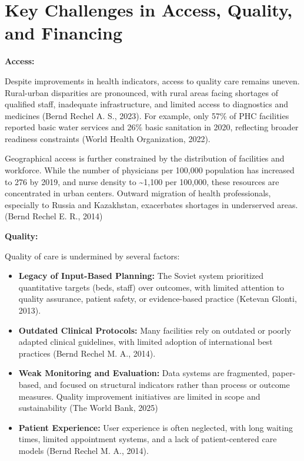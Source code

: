 \section{Key Challenges in Access, Quality, and Financing}\label{key-challenges-in-access-quality-and-financing}

\textbf{Access:}

Despite improvements in health indicators, access to quality care
remains uneven. Rural-urban disparities are pronounced, with rural areas
facing shortages of qualified staff, inadequate infrastructure, and
limited access to diagnostics and medicines (Bernd Rechel A. S., 2023).
For example, only 57\% of PHC facilities reported basic water services
and 26\% basic sanitation in 2020, reflecting broader readiness
constraints (World Health Organization, 2022).

Geographical access is further constrained by the distribution of
facilities and workforce. While the number of physicians per 100,000
population has increased to 276 by 2019, and nurse density to
\textasciitilde1,100 per 100,000, these resources are concentrated in
urban centers. Outward migration of health professionals, especially to
Russia and Kazakhstan, exacerbates shortages in underserved areas.
(Bernd Rechel E. R., 2014)

\textbf{Quality:}

Quality of care is undermined by several factors:

\begin{itemize}
\item
  \textbf{Legacy of Input-Based Planning:} The Soviet system prioritized
  quantitative targets (beds, staff) over outcomes, with limited
  attention to quality assurance, patient safety, or evidence-based
  practice (Ketevan Glonti, 2013).
\item
  \textbf{Outdated Clinical Protocols:} Many facilities rely on outdated
  or poorly adapted clinical guidelines, with limited adoption of
  international best practices (Bernd Rechel M. A., 2014).
\item
  \textbf{Weak Monitoring and Evaluation:} Data systems are fragmented,
  paper-based, and focused on structural indicators rather than process
  or outcome measures. Quality improvement initiatives are limited in
  scope and sustainability (The World Bank, 2025)
\item
  \textbf{Patient Experience:} User experience is often neglected, with
  long waiting times, limited appointment systems, and a lack of
  patient-centered care models (Bernd Rechel M. A., 2014).
\end{itemize}

